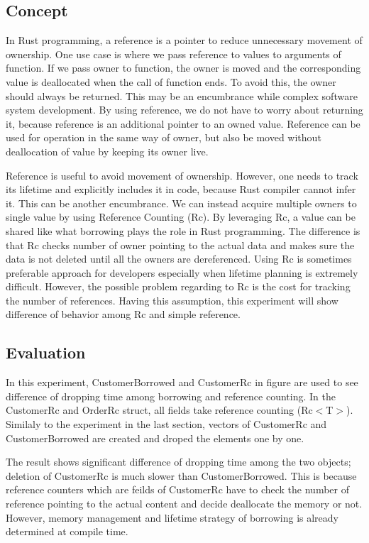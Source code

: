 \subsection{Concept}
In Rust programming, a reference is a pointer to reduce unnecessary movement of ownership. 
One use case is where we pass reference to values to arguments of function. 
If we pass owner to function, the owner is moved and the corresponding value is deallocated when the call of function ends. 
To avoid this, the owner should always be returned. This may be an encumbrance while complex software system development. 
By using reference, we do not have to worry about returning it, because reference is an additional pointer to an owned value. 
Reference can be used for operation in the same way of owner, but also be moved without deallocation of value by keeping its owner live. 

Reference is useful to avoid movement of ownership. However, one needs to track its lifetime and explicitly includes it in code, 
because Rust compiler cannot infer it. This can be another encumbrance. We can instead acquire multiple owners to single value by using Reference Counting (Rc). 
By leveraging Rc, a value can be shared like what borrowing plays the role in Rust programming. 
The difference is that Rc checks number of owner pointing to the actual data and makes sure the data is not deleted 
until all the owners are dereferenced. Using Rc is sometimes preferable approach for developers especially when lifetime planning is extremely difficult.
However, the possible problem regarding to Rc is the cost for tracking the number of references. 
Having this assumption, this experiment will show difference of behavior among Rc and simple reference.

\subsection{Evaluation}
In this experiment, CustomerBorrowed and CustomerRc in figure are used to see difference of dropping time among borrowing and reference counting. 
In the CustomerRc and OrderRc struct, all fields take reference counting (Rc$<$T$>$). Similaly to the experiment in the last section, 
vectors of CustomerRc and CustomerBorrowed are created and droped the elements one by one. 

The result shows significant difference of dropping time among the two objects; deletion of CustomerRc is much slower than CustomerBorrowed. 
This is because reference counters which are feilds of CustomerRc have to check the number of reference pointing to the actual content and decide 
deallocate the memory or not. However, memory management and lifetime strategy of borrowing is already determined at compile time.


